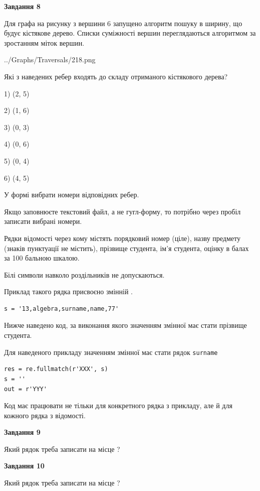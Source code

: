 \documentclass[12pt, ukrainian]{article}
\def\code#1{\Verb!#1!}
\begin{document}
{\begin {large}
{\begin {center}\textbf{Завдання 8}\end {center}}\par
Для графа на рисунку з вершини 6 запущено алгоритм пошуку в ширину, що будує кістякове дерево. Списки суміжності вершин переглядаються алгоритмом за зростанням міток вершин.\par
\begin{center}
	{../Graphs/Traversals/218.png}
\end{center}
\par Які з наведених ребер входять до складу отриманого кістякового дерева?\par
1) (2, 5)\par
2) (1, 6)\par
3) (0, 3)\par
4) (0, 6)\par
5) (0, 4)\par
6) (4, 5)\par
{\vskip 15pt} У формі вибрати номери відповідних ребер.


Якщо заповнюєте текстовий файл, а не гугл-форму, то потрібно через пробіл записа\-ти вибрані номери.\par
\newpage


Рядки відомості через кому містять порядковий номер (ціле), назву предмету (зна\-ків пунктуації не містить), прізвище студента, ім'я студента, оцінку в балах за 100 бальною шкалою.

Білі символи навколо роздільників не допускаються.

Приклад такого рядка присвоєно змінній .



\begin{verbatim}
s = '13,algebra,surname,name,77'
\end{verbatim}


Нижче наведено код, за виконання якого значенням змінної  має стати прізвище студента.

Для наведеного прикладу значенням змінної  має стати рядок \code{surname}



\begin{verbatim}
res = re.fullmatch(r'XXX', s)
s = ''
out = r'YYY'
\end{verbatim}


Код має працювати не тільки для конкретного рядка з прикладу, але й для кожного рядка з відомості.

{\begin {center}\textbf{Завдання 9}\end {center}}\par
Який рядок треба записати на місце  ?\par
\vspace{5mm}


{\begin {center}\textbf{Завдання 10}\end {center}}\par
Який рядок треба записати на місце  ?\par


\newpage


\end {large}}
\end{document}
